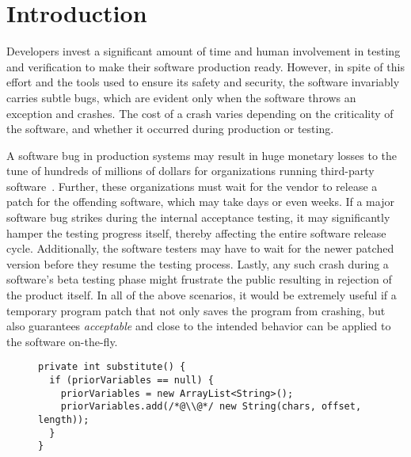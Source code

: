 \section{Introduction}
\label{sec:intro}


Developers invest a significant amount of time and human involvement in testing
and verification to make their software production ready. However, in spite of
this effort and the tools used to ensure its safety and security, the software
invariably carries subtle bugs, which are evident only when the software
throws an exception and crashes. The cost of a 
crash varies depending on the criticality of the software, and
whether it occurred during production or testing.

A software bug in production systems may result in huge monetary losses to the
tune of hundreds of millions of dollars for organizations running third-party
software~\cite{hp, amazon, hershey, nike}. Further, these organizations must
wait for the vendor to release a patch for the offending software, which may
take days or even weeks. If a major software bug strikes during the internal 
acceptance testing, it may significantly hamper the testing progress itself,
thereby affecting the entire software release cycle.
Additionally, the software testers may have to wait for the
newer patched version before they resume the testing process. Lastly, any such
crash during a software's beta testing phase might frustrate the public
resulting in rejection of the product itself. In all of the above scenarios, it
would be extremely useful if a temporary program patch that not only saves the
program from crashing, but also guarantees \textit{acceptable} and
close to the intended behavior can be applied to the software on-the-fly.


\begin{figure}[t]
\begin{lstlisting}
private int substitute() {
  if (priorVariables == null) {
    priorVariables = new ArrayList<String>();
    priorVariables.add(/*@\\@*/ new String(chars, offset, length));
  }
}
\end{lstlisting}
\end{figure}

